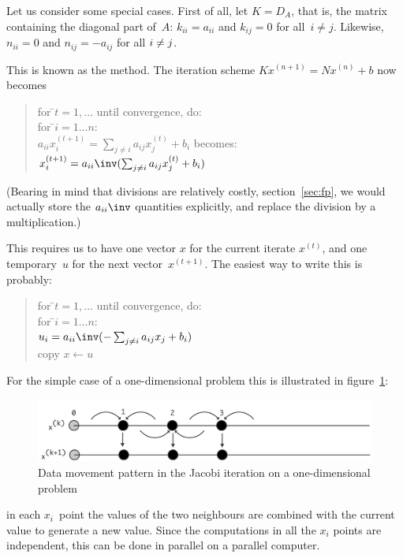 Let us consider some special cases. First of all, let $K=D_A$, that
is, the matrix containing the diagonal part of~$A$: $k_{ii}=a_{ii}$
and $k_{ij}=0$ for all~\mbox{$i\not=j$}. 
Likewise, $n_{ii}=0$ and $n_{ij}=-a_{ij}$ for all $i\not=\nobreak j$.

This is known as the
 method. The iteration scheme
$Kx^{(n+1)}=Nx^{(n)}+b$
now becomes
\begin{quote}
  \begin{tabbing}
    for \=$t=1,\ldots$ until convergence, do:\\
    \>for \=$i=1\ldots n$:\\
    \>\>{\tt //} $a_{ii}x^{(t+1)}_i = \sum_{j\not=i}
    a_{ij}x^{(t)}_j+b_i$ becomes:\\
    \>\>$x^{(t+1)}_i = a_{ii}\inv(\sum_{j\not=i} a_{ij}x^{(t)}_j+b_i)$
  \end{tabbing}
\end{quote}
(Bearing in mind that divisions are relatively costly,
section~\ref{sec:fp}, we would actually store the $a_{ii}\inv$
quantities explicitly, and replace the division by a multiplication.)

This requires us to have one vector $x$ for the current iterate
$x^{(t)}$, and one temporary~$u$ for the next vector~$x^{(t+1)}$. The
easiest way to write this is probably:
\begin{quote}
  \begin{tabbing}
    for \=$t=1,\ldots$ until convergence, do:\\
    \>for \=$i=1\ldots n$:\\
    \>\>$u_i = a_{ii}\inv (-\sum_{j\not=i} a_{ij}x_j+b_i)$\\
    \>copy $x\leftarrow u$
  \end{tabbing}
\end{quote}
For the simple case of a one-dimensional problem this is illustrated
in figure~\ref{fig:1d-jacobi}:
\begin{figure}[ht]
  \includegraphics[scale=.08]{graphics/jacobi}
  \caption{Data movement pattern in the Jacobi iteration on a
    one-dimensional problem}
  \label{fig:1d-jacobi}
\end{figure}
in each $x_i$~point the values of the two neighbours are combined with
the current value to generate a new value. Since the computations in
all the $x_i$ points are independent, this can be done
in parallel on a parallel computer.

